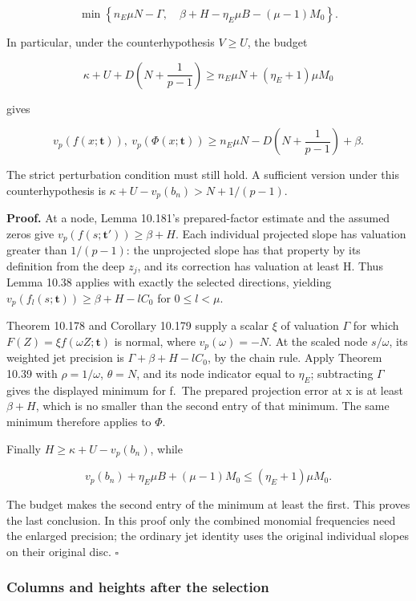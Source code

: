 \documentclass[
  11pt,
  a4paper,
]{article}
\begin{document}
\[
\min\left\{n_E\mu N-\Gamma,\quad
\beta+H-\eta_E\mu B-(\mu-1)M_0\right\}.
\tag{10.690}
\]

In particular, under the counterhypothesis \(V\ge U\), the budget

\[
\kappa+U+D\left(N+\frac1{p-1}\right)
\ge n_E\mu N+(\eta_E+1)\mu M_0
\tag{10.691}
\]

gives

\[
v_p(f(x;\boldsymbol t)),\ v_p(\Phi(x;\boldsymbol t))
\ge n_E\mu N-D\left(N+\frac1{p-1}\right)+\beta.
\tag{10.692}
\]

The strict perturbation condition must still hold. A sufficient version
under this counterhypothesis is \(\kappa+U-v_p(b_n)>N+1/(p-1)\).

\textbf{Proof.} At a node, Lemma 10.181's prepared-factor estimate and
the assumed zeros give \(v_p(f(s;\boldsymbol t'))\ge\beta+H\). Each
individual projected slope has valuation greater than \(1/(p-1)\): the
unprojected slope has that property by its definition from the deep
\(z_j\), and its correction has valuation at least H. Thus Lemma 10.38
applies with exactly the selected directions, yielding
\(v_p(f_l(s;\boldsymbol t))\ge\beta+H-lC_0\) for \(0\le l<\mu\).

Theorem 10.178 and Corollary 10.179 supply a scalar \(\xi\) of valuation
\(\Gamma\) for which \(F(Z)=\xi f(\omega Z;\boldsymbol t)\) is normal,
where \(v_p(\omega)=-N\). At the scaled node \(s/\omega\), its weighted
jet precision is \(\Gamma+\beta+H-lC_0\), by the chain rule. Apply
Theorem 10.39 with \(\rho=1/\omega\), \(\theta=N\), and its node
indicator equal to \(\eta_E\); subtracting \(\Gamma\) gives the
displayed minimum for f.~The prepared projection error at x is at least
\(\beta+H\), which is no smaller than the second entry of that minimum.
The same minimum therefore applies to \(\Phi\).

Finally \(H\ge\kappa+U-v_p(b_n)\), while

\[
v_p(b_n)+\eta_E\mu B+(\mu-1)M_0
\le(\eta_E+1)\mu M_0.
\tag{10.693}
\]

The budget makes the second entry of the minimum at least the first.
This proves the last conclusion. In this proof only the combined
monomial frequencies need the enlarged precision; the ordinary jet
identity uses the original individual slopes on their original disc.
\(\square\)

\subsubsection{Columns and heights after the
selection}\label{columns-and-heights-after-the-selection}
\end{document}
